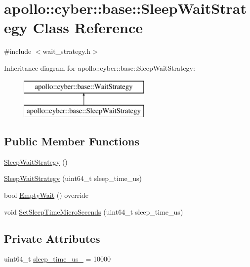 \hypertarget{classapollo_1_1cyber_1_1base_1_1SleepWaitStrategy}{\section{apollo\-:\-:cyber\-:\-:base\-:\-:Sleep\-Wait\-Strategy Class Reference}
\label{classapollo_1_1cyber_1_1base_1_1SleepWaitStrategy}
}


{\ttfamily \#include $<$wait\-\_\-strategy.\-h$>$}

Inheritance diagram for apollo\-:\-:cyber\-:\-:base\-:\-:Sleep\-Wait\-Strategy\-:\begin{figure}[H]
\begin{center}
\leavevmode
\includegraphics[height=2.000000cm]{classapollo_1_1cyber_1_1base_1_1SleepWaitStrategy}
\end{center}
\end{figure}
\subsection*{Public Member Functions}
\begin{DoxyCompactItemize}
\item 
\hyperlink{classapollo_1_1cyber_1_1base_1_1SleepWaitStrategy_af22660df1a87e2e576e9efc307a207e5}{Sleep\-Wait\-Strategy} ()
\item 
\hyperlink{classapollo_1_1cyber_1_1base_1_1SleepWaitStrategy_a3bdd816ffaa3ddd7e46ee9959a3262fb}{Sleep\-Wait\-Strategy} (uint64\-\_\-t sleep\-\_\-time\-\_\-us)
\item 
bool \hyperlink{classapollo_1_1cyber_1_1base_1_1SleepWaitStrategy_a5f5950c291b033be0e570035681e7f50}{Empty\-Wait} () override
\item 
void \hyperlink{classapollo_1_1cyber_1_1base_1_1SleepWaitStrategy_aa461df397aa43dc8bd25743a9e266614}{Set\-Sleep\-Time\-Micro\-Secends} (uint64\-\_\-t sleep\-\_\-time\-\_\-us)
\end{DoxyCompactItemize}
\subsection*{Private Attributes}
\begin{DoxyCompactItemize}
\item 
uint64\-\_\-t \hyperlink{classapollo_1_1cyber_1_1base_1_1SleepWaitStrategy_a3878d842918fde837f3835347990ac5c}{sleep\-\_\-time\-\_\-us\-\_\-} = 10000
\end{DoxyCompactItemize}


